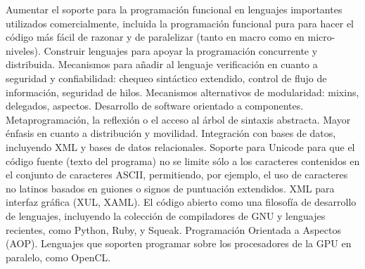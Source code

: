 \documentclass[twoside,twocolumn]{article}
\begin{document}
    Aumentar el soporte para la programación funcional en lenguajes importantes utilizados comercialmente, incluida la programación funcional pura para hacer el código más fácil de razonar y de paralelizar (tanto en macro como en micro-niveles).
    Construir lenguajes para apoyar la programación concurrente y distribuida.
    Mecanismos para añadir al lenguaje verificación en cuanto a seguridad y confiabilidad: chequeo sintáctico extendido, control de flujo de información, seguridad de hilos.
    Mecanismos alternativos de modularidad: mixins, delegados, aspectos.
    Desarrollo de software orientado a componentes.
    Metaprogramación, la reflexión o el acceso al árbol de sintaxis abstracta.
    Mayor énfasis en cuanto a distribución y movilidad.
    Integración con bases de datos, incluyendo XML y bases de datos relacionales.
    Soporte para Unicode para que el código fuente (texto del programa) no se limite sólo a los caracteres contenidos en el conjunto de caracteres ASCII, permitiendo, por ejemplo, el uso de caracteres no latinos basados en guiones o signos de puntuación extendidos.
    XML para interfaz gráfica (XUL, XAML).
    El código abierto como una filosofía de desarrollo de lenguajes, incluyendo la colección de compiladores de GNU y lenguajes recientes, como Python, Ruby, y Squeak.
    Programación Orientada a Aspectos (AOP).
    Lenguajes que soporten programar sobre los procesadores de la GPU en paralelo, como OpenCL.






\begin{thebibliography}{99} %

\end{thebibliography}

\end{document}
